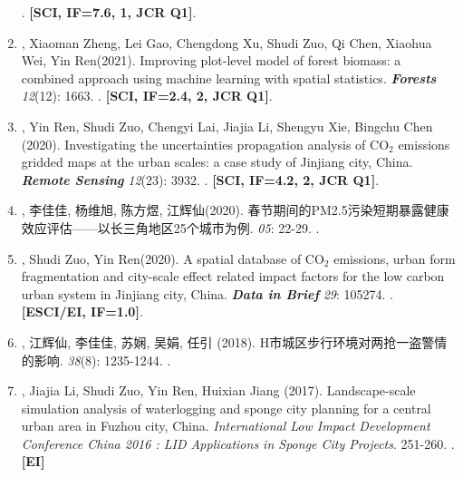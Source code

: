 \begin{enumerate}
    . 
    \textbf{[SCI, IF=7.6, 1, JCR Q1]}.
\item
    \Shaoqing\CF, Xiaoman Zheng\CF, Lei Gao, Chengdong Xu, Shudi Zuo, Qi Chen, Xiaohua Wei, Yin Ren\CS (2021).
    Improving plot-level model of forest biomass: a combined approach using machine learning with spatial statistics.
    \textbf{\textit{Forests}} \textit{12}(12): 1663.
    . 
    \textbf{[SCI, IF=2.4, 2, JCR Q1]}.
\item
    \Shaoqing\CF, Yin Ren\CF, Shudi Zuo\CS, Chengyi Lai, Jiajia Li, Shengyu Xie, Bingchu Chen (2020).
    Investigating the uncertainties propagation analysis of CO$_2$ emissions gridded maps at the urban scales: a case study of Jinjiang city, China. 
    \textbf{\textit{Remote Sensing}} \textit{12}(23): 3932.
    . 
    \textbf{[SCI, IF=4.2, 2, JCR Q1]}.
\item
    {}, 李佳佳, 杨维旭, 陈方煜, 江辉仙\CS(2020).
    春节期间的PM2.5污染短期暴露健康效应评估——以长三角地区25个城市为例.
    \textbf{} \textit{05}: 22-29.
    . 
    \textbf{} 
\item
    \Shaoqing, Shudi Zuo, Yin Ren\CS (2020).
    A spatial database of CO$_2$ emissions, urban form fragmentation and city-scale effect related impact factors for the low carbon urban system in Jinjiang city, China.
    \textbf{\textit{Data in Brief}} \textit{29}: 105274.
    . 
    \textbf{[ESCI/EI, IF=1.0]}.
\item
    {}, 江辉仙\CS, 李佳佳, 苏娴, 吴娟, 任引 (2018).
	H市城区步行环境对两抢一盗警情的影响.
    \textbf{} \textit{38}(8): 1235-1244.
    . 
    \textbf{}
\item
    \Shaoqing, Jiajia Li, Shudi Zuo, Yin Ren\CS, Huixian Jiang (2017).
	Landscape-scale simulation analysis of waterlogging and sponge city planning for a central urban area in Fuzhou city, China.
    \textit{International Low Impact Development Conference China 2016 : LID Applications in Sponge City Projects}. 251-260.
    . 
    \textbf{[EI]}

\end{enumerate}

